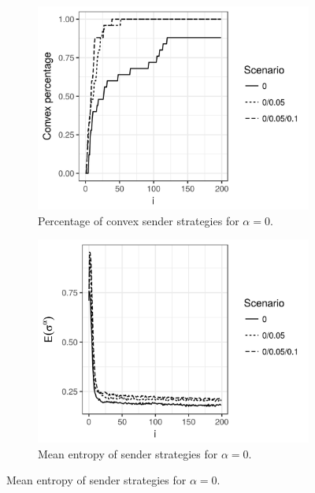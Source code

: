 \documentclass[a4paper]{article}
\begin{document}
\begin{figure}
  \centering
  \begin{subfigure}[]{0.32\textwidth}
    \includegraphics[width=\textwidth]{simulation/results/round-3/plots/convex-percentage-all-strong.png}
    \caption{Percentage of convex sender strategies for $\alpha = 0$.}
    \label{fig:convexity-tight-interaction}
  \end{subfigure}
  \hfill
  \begin{subfigure}[]{0.32\textwidth}
    \includegraphics[width=\textwidth]{simulation/results/round-3/plots/entropy-sender-all-strong.png}
    \caption{Mean entropy of sender strategies for $\alpha = 0$.}
    \label{fig:entropy-sender-tight-interaction}
  \end{subfigure}

\end{figure}
\end{document}
